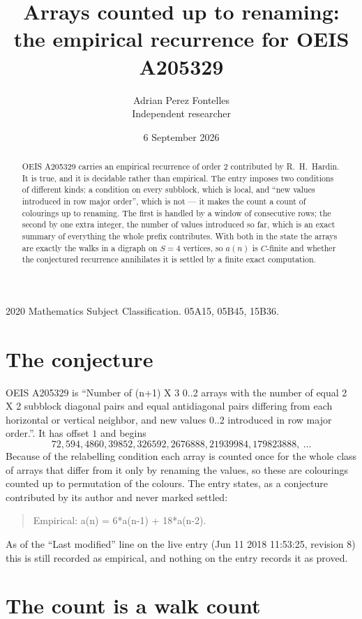 \documentclass[11pt,a4paper]{article}
\title{Arrays counted up to renaming: the empirical recurrence for OEIS A205329}
\author{Adrian Perez Fontelles\\ \small Independent researcher}
\date{6 September 2026}
\theoremstyle{plain}
\theoremstyle{definition}
\begin{document}
\maketitle

\begin{abstract}
OEIS A205329 carries an empirical recurrence of order $2$ contributed by R.~H.~Hardin. It is
true, and it is decidable rather than empirical. The entry imposes two conditions of different
kinds: a condition on every subblock, which is local, and ``new values introduced in row major
order'', which is not --- it makes the count a count of colourings up to renaming. The first is
handled by a window of consecutive rows; the second by one extra integer, the number of values
introduced so far, which is an exact summary of everything the whole prefix contributes. With
both in the state the arrays are exactly the walks in a digraph on $S=4$ vertices, so $a(n)$
is $C$-finite and whether the conjectured recurrence annihilates it is settled by a finite
exact computation.
\end{abstract}

\noindent\small 2020 Mathematics Subject Classification. 05A15, 05B45, 15B36.\normalsize

\section{The conjecture}

OEIS A205329 is ``Number of (n+1) X 3 0..2 arrays with the number of equal 2 X 2 subblock diagonal pairs and equal antidiagonal pairs differing from each horizontal or vertical neighbor, and new values 0..2 introduced in row major order.''. It has offset $1$ and begins
\[
72, 594, 4860, 39852, 326592, 2676888, 21939984, 179823888,\ \dots
\]
Because of the relabelling condition each array is counted once for the whole class of arrays that differ from it only by renaming the values, so these are colourings counted up to permutation of the colours.
The entry states, as a conjecture contributed by its author and never marked settled:
\begin{quote}
Empirical: a(n) = 6*a(n-1) + 18*a(n-2).
\end{quote}
As of the ``Last modified'' line on the live entry (Jun 11 2018 11:53:25, revision 8) this is still
recorded as empirical, and nothing on the entry records it as proved.

\section{The count is a walk count}
\end{document}
